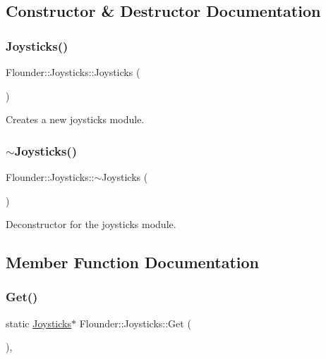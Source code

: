 \subsection{Constructor \& Destructor Documentation}
\mbox{\label{class_flounder_1_1_joysticks_a4465b7247fd550ea28974cf0d26a6ffa}} 
\subsubsection{\texorpdfstring{Joysticks()}{Joysticks()}}
{\footnotesize\ttfamily Flounder\+::\+Joysticks\+::\+Joysticks (\begin{DoxyParamCaption}{ }\end{DoxyParamCaption})}



Creates a new joysticks module. 

\mbox{\label{class_flounder_1_1_joysticks_a819718520fdb729b58f1db3bd698016a}} 
\subsubsection{\texorpdfstring{$\sim$\+Joysticks()}{~Joysticks()}}
{\footnotesize\ttfamily Flounder\+::\+Joysticks\+::$\sim$\+Joysticks (\begin{DoxyParamCaption}{ }\end{DoxyParamCaption})}



Deconstructor for the joysticks module. 



\subsection{Member Function Documentation}
\mbox{\label{class_flounder_1_1_joysticks_ad64ff5ab393e75d14ba3af58e7aa3ef6}} 
\subsubsection{\texorpdfstring{Get()}{Get()}}
{\footnotesize\ttfamily static \hyperlink{class_flounder_1_1_joysticks}{Joysticks}$\ast$ Flounder\+::\+Joysticks\+::\+Get (\begin{DoxyParamCaption}{ }\end{DoxyParamCaption})\hspace{0.3cm}{\ttfamily [inline]}, {\ttfamily [static]}}



